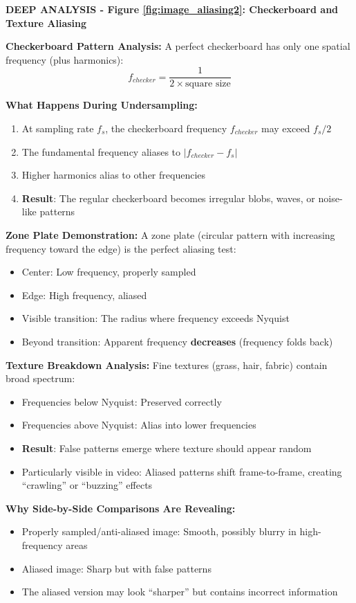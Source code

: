 \documentclass[12pt,a4paper]{article}
\begin{document}
\begin{deepexplanation}
\textbf{DEEP ANALYSIS - Figure \ref{fig:image_aliasing2}: Checkerboard and Texture Aliasing}

\textbf{Checkerboard Pattern Analysis:}
A perfect checkerboard has only one spatial frequency (plus harmonics):
\[
f_{checker} = \frac{1}{2 \times \text{square size}}
\]

\textbf{What Happens During Undersampling:}
\begin{enumerate}
    \item At sampling rate $f_s$, the checkerboard frequency $f_{checker}$ may exceed $f_s/2$
    \item The fundamental frequency aliases to $|f_{checker} - f_s|$
    \item Higher harmonics alias to other frequencies
    \item \textbf{Result}: The regular checkerboard becomes irregular blobs, waves, or noise-like patterns
\end{enumerate}

\textbf{Zone Plate Demonstration:}
A zone plate (circular pattern with increasing frequency toward the edge) is the perfect aliasing test:
\begin{itemize}
    \item Center: Low frequency, properly sampled
    \item Edge: High frequency, aliased
    \item Visible transition: The radius where frequency exceeds Nyquist
    \item Beyond transition: Apparent frequency \textbf{decreases} (frequency folds back)
\end{itemize}

\textbf{Texture Breakdown Analysis:}
Fine textures (grass, hair, fabric) contain broad spectrum:
\begin{itemize}
    \item Frequencies below Nyquist: Preserved correctly
    \item Frequencies above Nyquist: Alias into lower frequencies
    \item \textbf{Result}: False patterns emerge where texture should appear random
    \item Particularly visible in video: Aliased patterns shift frame-to-frame, creating ``crawling'' or ``buzzing'' effects
\end{itemize}

\textbf{Why Side-by-Side Comparisons Are Revealing:}
\begin{itemize}
    \item Properly sampled/anti-aliased image: Smooth, possibly blurry in high-frequency areas
    \item Aliased image: Sharp but with false patterns
    \item The aliased version may look ``sharper'' but contains incorrect information
\end{itemize}
\end{deepexplanation}
\end{document}
